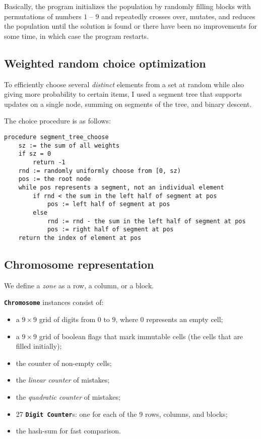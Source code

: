 \documentclass[10pt]{article}
\begin{document}
Basically, the program initializes the population by randomly filling blocks
with permutations of numbers $1$ -- $9$ and repeatedly crosses over, mutates,
and reduces the population until the solution is found or there have been no
improvements for some time, in which case the program restarts.

\subsection{Weighted random choice optimization}
To efficiently choose several \textit{distinct} elements from a set at random while also
giving more probability to certain items, I used a segment tree that supports
updates on a single node, summing on segments of the tree, and binary descent.

The choice procedure is as follows:

\begin{lstlisting}[language=pseu, style=lststyle]
procedure segment_tree_choose
    sz := the sum of all weights
    if sz = 0
        return -1
    rnd := randomly uniformly choose from [0, sz)
    pos := the root node
    while pos represents a segment, not an individual element
        if rnd < the sum in the left half of segment at pos
            pos := left half of segment at pos
        else
            rnd := rnd - the sum in the left half of segment at pos
            pos := right half of segment at pos
    return the index of element at pos
\end{lstlisting}

\subsection{Chromosome representation}\label{repr}

We define a \textit{zone} as a row, a column, or a block.

\textbf{\texttt{Chromosome}} instances consist of:

\begin{itemize}
    \item a $9\times9$ grid of digits from $0$ to $9$, where $0$ represents an
        empty cell;
    \item a $9\times9$ grid of boolean flags that mark immutable cells (the cells
        that are filled initially);
    \item the counter of non-empty cells;
    \item the \textit{linear counter} of mistakes;
    \item the \textit{quadratic counter} of mistakes;
    \item 27 \textbf{\texttt{Digit Counter}}s: one for each of the 9 rows, columns, and blocks;
    \item the hash-sum for fast comparison.
\end{itemize}
\end{document}
